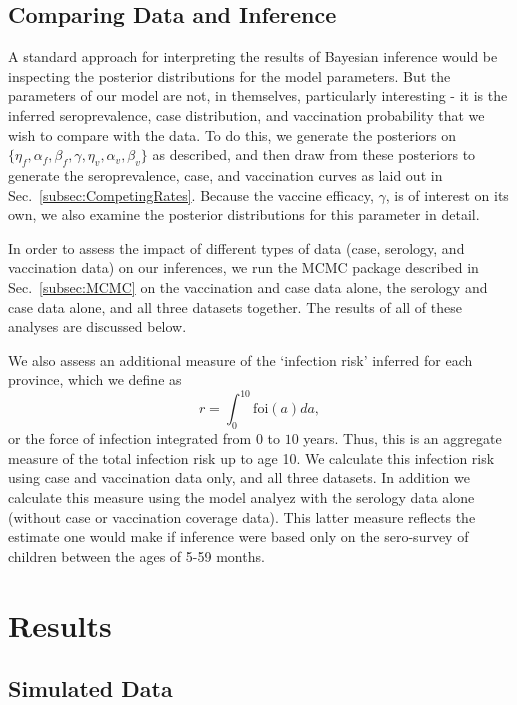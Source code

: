 \documentclass[nofootinbib,aps,pre,twocolumn,superscriptaddress,showkeys,showpacs]{revtex4-1}
\begin{document}
\subsection{Comparing Data and Inference \label{subsec:Comp}}
A standard approach for interpreting the results of Bayesian inference would be inspecting the posterior distributions for the model parameters. But the parameters of our model are not, in themselves, particularly interesting - it is the inferred seroprevalence, case distribution, and vaccination probability that we wish to compare with the data. To do this, we generate the posteriors on $\{\eta_f, \alpha_f, \beta_f, \gamma, \eta_v, \alpha_v, \beta_v\}$ as described, and then draw from these posteriors to generate the seroprevalence, case, and vaccination curves as laid out in Sec.~\ref{subsec:CompetingRates}. Because the vaccine efficacy, $\gamma$, is of interest on its own, we also examine the posterior distributions for this parameter in detail.

In order to assess the impact of different types of data (case, serology, and vaccination data) on our inferences, we run the MCMC package described in Sec.~\ref{subsec:MCMC} on the vaccination and case data alone, the serology and case data alone, and all three datasets together. The results of all of these analyses are discussed below.

We also assess an additional measure of the `infection risk' inferred for each province, which we define as
\begin{equation}
r = \int_0^{10} \mathrm{foi}(a) da,
\end{equation}
 or the force of infection integrated from 0 to $10$ years.  Thus, this is an aggregate measure of the total infection risk up to age 10. We calculate this infection risk using  case and vaccination data only, and all three datasets. In addition we calculate this measure using the model analyez with the serology data alone (without case or vaccination coverage data).  This latter measure reflects the estimate one would make if inference were based only on the sero-survey of children between the ages of 5-59 months.  
 
\section{Results \label{sec:Results}}
\subsection{Simulated Data \label{subsec:SimDat}}
\end{document}
